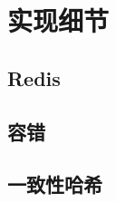 \chapter{实现细节}\label{chapter:implementation}

\section{Redis}\label{section:redis}

\section{容错}\label{section:fault}

\section{一致性哈希}\label{section:consistent}
